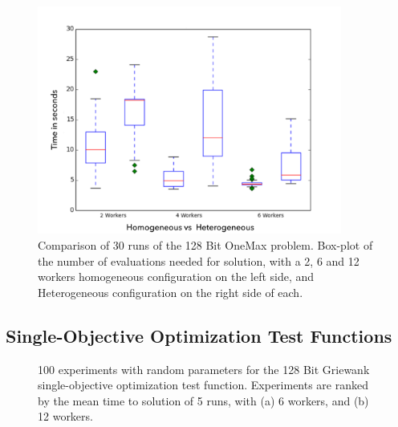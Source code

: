 \documentclass{llncs}
\begin{document}
\begin{figure}[t]
    \centering
        \includegraphics[width=10cm]{img/one_max_comp.png}
    \caption{Comparison of 30 runs of the 128 Bit OneMax problem. 
    Box-plot of the number of evaluations needed for solution, with a 2, 6 and 12 workers
    homogeneous configuration on the left side, and Heterogeneous configuration on the
    right side of each.
    }
    \label{fig:comp-onemax}
\end{figure}


\subsection{ Single-Objective Optimization Test Functions}

\begin{figure}[b]
    \centering

    \caption{100 experiments with random parameters for the 128 Bit Griewank 
    single-objective optimization test function. Experiments are ranked by 
    the mean time to solution of 5 runs, with (a) 6 workers, and (b) 12 workers.}
    \label{fig:griewank-homo}
\end{figure}
\end{document}
